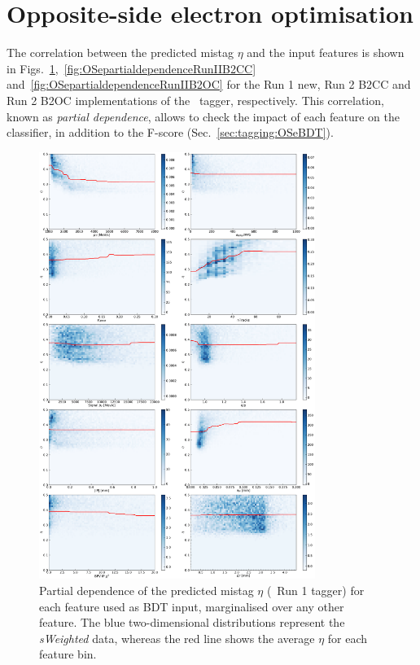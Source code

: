 \section{Opposite-side electron optimisation}
\label{app:oselectronappendix}

The correlation between the predicted mistag $\eta$ and the input features is shown in Figs.~\ref{fig:OSepartialdependenceRunI},~\ref{fig:OSepartialdependenceRunIIB2CC} and~\ref{fig:OSepartialdependenceRunIIB2OC}  for the Run 1 new, Run 2 B2CC and Run 2 B2OC implementations of the \OSe~tagger, respectively. This correlation, known as \emph{partial dependence}, allows to check the impact of each feature on the classifier, in addition to the F-score (Sec.~\ref{sec:tagging:OSeBDT}).

\begin{figure}[t]
        \centering
        \includegraphics[width=0.8\textwidth]{04FlavourTagging/figs/OSelectronOpt/2017-12-12-vibattis-OSElectron-bdt-calibration-sWeights_Run1/PartialDependence_RunIcuts.pdf}
        \vspace{-2mm}
        \caption{Partial dependence of the predicted mistag $\eta$ (\OSe~Run 1 tagger) for each feature used as BDT input, marginalised over any other feature. The blue two-dimensional distributions represent the \emph{sWeighted} data, whereas the red line shows the average $\eta$ for each feature bin.}
         \label{fig:OSepartialdependenceRunI}
\end{figure}

